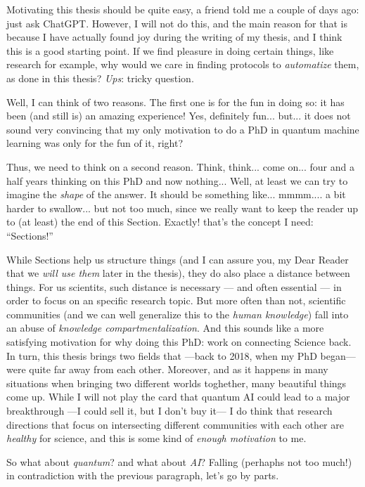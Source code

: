 Motivating this thesis should be quite easy, a friend told me a couple of days ago: just ask ChatGPT. However, I will not do this, and the main reason for that is because I have actually found joy during the writing of my thesis, and I think this is a good starting point. If we find pleasure in doing certain things, like research for example, why would we care in finding protocols to \textit{automatize} them, as done in this thesis? \textit{Ups}: tricky question.

Well, I can think of two reasons. The first one is for the fun in doing so: it has been (and still is) an amazing experience! Yes, definitely fun... but... it does not sound very convincing that my only motivation to do a PhD in quantum machine learning was only for the fun of it, right? %

Thus, we need to think on a second reason. Think, think... come on... four and a half years thinking on this PhD and now nothing... Well, at least we can try to imagine the \textit{shape} of the answer. It should be something like... mmmm.... a bit harder to swallow... but not too much, since we really want to keep the reader up to (at least) the end of this Section. Exactly! that's the concept I need: ``Sections!''

While Sections help us structure things (and I can assure you, my Dear Reader that we \textit{will use them} later in the thesis), they do also place a distance between things. For us scientits, such distance is necessary --- and often essential --- in order to focus on an specific research topic. But more often than not, scientific communities (and we can well generalize this to the \textit{human knowledge}) fall into an abuse of \textit{knowledge compartmentalization}. And this sounds like a more satisfying motivation for why doing this PhD: work on connecting Science back. In turn, this thesis brings two fields that ---back to 2018, when my PhD began--- were quite far away from each other. Moreover, and as it happens in many situations when bringing two different worlds toghether, many beautiful things come up. While I will not play the card that quantum AI could lead to a major breakthrough ---I could sell it, but I don't buy it---  I do think that research directions that focus on intersecting different communities with each other are \textit{healthy} for science, and this is some kind of \textit{enough motivation} to me.

So what about \textit{quantum}? and what about \textit{AI}? Falling (perhaphs not too much!) in contradiction with the previous paragraph, let's go by parts.

